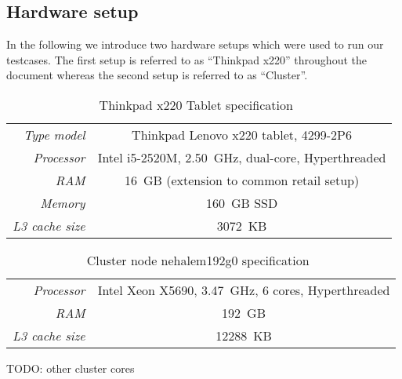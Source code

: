 \begin{appendices}
\chapter{Hardware setup}
\label{app:setup}
%
In the following we introduce two hardware setups which were used to run
our testcases. The first setup is referred to as \enquote{Thinkpad x220}
throughout the document whereas the second setup is referred to as
\enquote{Cluster}.

%
\begin{table}[!ht]
  \begin{center}
    \begin{tabular}{rc}
      \hline
      \emph{Type model}     & Thinkpad Lenovo x220 tablet, 4299-2P6 \\
      \emph{Processor}      & Intel i5-2520M, 2.50~GHz, dual-core, Hyperthreaded \\
      \emph{RAM}            & 16~GB (extension to common retail setup)  \\
      \emph{Memory}         & 160~GB SSD \\
      \emph{L3 cache size}  & 3072~KB \\
      \hline
    \end{tabular}
    \caption{Thinkpad x220 Tablet specification~\cite{thinkpadx220}}
    \label{setup:thinkpadx220}
  \end{center}
\end{table}

\begin{table}[!ht]
  \begin{center}
    \begin{tabular}{rc}
      \hline
      \emph{Processor}     & Intel Xeon X5690, 3.47~GHz, 6 cores, Hyperthreaded \\
      \emph{RAM}           & 192~GB \\
      \emph{L3 cache size} & 12288~KB \\
      \hline
    \end{tabular}
    \caption{Cluster node nehalem192g0 specification~\cite{intelX5690}}
    \label{setup:cluster}
  \end{center}
\end{table}

TODO: other cluster cores



\end{appendices}

